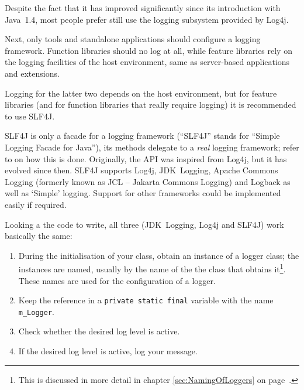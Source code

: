 \documentclass[11pt,a4paper, titlepage, parskip=half, headsepline, footsepline, cleardoublepage=current, headheight=1cm]{scrbook}
\newcommand*{\tqvref}[1]{\hyperref[{#1}]{\ref*{#1}} on page~\pageref{#1}}
\begin{document}
Despite the fact that it has improved significantly since its introduction with Java~1.4, most people prefer still use the logging subsystem provided by Log4j\autocite{APACHE_LOG4J}.

Next, only tools and standalone applications should configure a logging framework. Function libraries should no log at all, while feature libraries rely on the logging facilities of the host environment, same as server-based applications and extensions.

Logging for the latter two depends on the host environment, but for feature libraries (and for function libraries that really require logging) it is recommended to use SLF4J\autocite{SLF4J}.

SLF4J is only a facade for a logging framework (“SLF4J” stands for “Simple Logging Facade for Java”), its methods delegate to a \textit{real} logging framework; refer to \autocite{SLF4J:Binding} on how this is done. Originally, the API was inspired from Log4j, but it has evolved since then. SLF4J supports Log4j, JDK~Logging, Apache Commons Logging\autocite{APACHE_COMMONS_LOGGING} (formerly known as JCL – Jakarta Commons Logging) and Logback\autocite{LOGBACK} as well as ‘Simple’ logging. Support for other frameworks could be implemented easily if required.

Looking a the code to write, all three (JDK~Logging, Log4j and SLF4J) work basically the same:
\begin{enumerate}[nosep]
\item{During the initialisation of your class, obtain an instance of a logger class; the instances are named, usually by the name of the the class that obtains it\footnote{This is discussed in more detail in chapter \tqvref{sec:NamingOfLoggers}.}. These names are used for the configuration of a logger.}
\item{Keep the reference in a \lstinline|private static final| variable with the name \lstinline|m_Logger|.}
\item{Check whether the desired log level is active.}
\item{If the desired log level is active, log your message.}
\end{enumerate}
\end{document}

